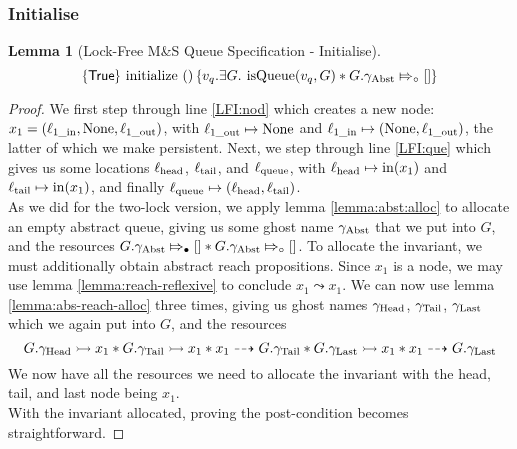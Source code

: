 \documentclass[a4paper, 10pt]{report}
\theoremstyle{definition}
\newtheorem{lemma}[theorem]{Lemma}
\newcommand{\initialise}{\operatorname{initialize}}
\newcommand{\msq}{M\&S Queue}
\newcommand{\lfmsq}{Lock-Free \msq{}}
\newcommand{\isqueue}{\operatorname{isQueue}}
\newcommand{\vq}{v_q}
\newcommand{\locinM}[1]{\loc_{#1\_\mathrm{in}}}
\newcommand{\locoutM}[1]{\loc_{#1\_\mathrm{out}}}
\newcommand{\locN}[1]{\loc_{\mathrm{#1}}}
\newcommand{\lochead}{\locN{head}}
\newcommand{\loctail}{\locN{tail}}
\newcommand{\locqueue}{\locN{queue}}
\newcommand{\nIn}[1]{\operatorname{in}(#1)}
\newcommand{\node}{x}
\newcommand{\nodeM}[1]{\node_{#1}}
\newcommand{\Qg}{G}
\newcommand{\gabst}{\gname_{\mathrm{Abst}}}
\newcommand{\ghead}{\gname_{\mathrm{Head}}}
\newcommand{\gtail}{\gname_{\mathrm{Tail}}}
\newcommand{\glast}{\gname_{\mathrm{Last}}}
\newcommand{\abstractstatefullfrag}[2]{#1 \Mapsto_{\circ} #2}
\newcommand{\abstractstateauth}[2]{#1 \Mapsto_{\bullet} #2}
\newcommand{\reach}[2]{#1 \leadsto #2}
\newcommand{\ar}[2]{#1 \dashrightarrow #2}
\newcommand{\ap}[2]{#1 \rightarrowtail #2}
\newcommand{\hocapspecinitHTGen}[2]{\hoare{\TRUE}{\initialise \ \TT}{#1 . \Exists #2 . \isqueue(#1, #2) \star{} \abstractstatefullfrag{#2.\gabst}{[]}}}
\newcommand{\hocapspecinitGen}[2]{\hocapspecinitHTGen{#1}{#2}}
\newcommand{\hocapspecinit}{\hocapspecinitGen{\vq}{\Qg}}
\begin{document}
\subsubsection{Initialise}
\begin{lemma}[\lfmsq{} Specification - Initialise]\label{LFMSQSPECS:spec:init}
  \begin{equation*}
    \hocapspecinit
  \end{equation*}
\end{lemma}
\begin{proof}
We first step through line \ref{LFI:nod} which creates a new node: $\nodeM{1} = (\locinM{1}, \None, \locoutM{1})$, with $\locoutM{1} \mapsto \None$ and $\locinM{1} \mapsto (\None, \locoutM{1})$, the latter of which we make persistent. Next, we step through line \ref{LFI:que} which gives us some locations $\lochead$, $\loctail$, and $\locqueue$, with $\lochead \mapsto \nIn{\nodeM{1}}$ and $\loctail \mapsto \nIn{\nodeM{1}}$, and finally $\locqueue \mapsto (\lochead, \loctail)$.\\
As we did for the two-lock version, we apply lemma \ref{lemma:abst:alloc} to allocate an empty abstract queue, giving us some ghost name $\gabst$ that we put into $\Qg$, and the resources $\abstractstateauth{\Qg.\gabst}{[]} \star{} \abstractstatefullfrag{\Qg.\gabst}{[]}$. To allocate the invariant, we must additionally obtain abstract reach propositions. Since $\nodeM{1}$ is a node, we may use lemma \ref{lemma:reach-reflexive} to conclude $\reach{\nodeM{1}}{\nodeM{1}}$. We can now use lemma \ref{lemma:abs-reach-alloc} three times, giving us ghost names $\ghead$, $\gtail$, $\glast$ which we again put into $\Qg$, and the resources
\begin{equation*}
  \ap{\Qg.\ghead}{\nodeM{1}} \star{} \ap{\Qg.\gtail}{\nodeM{1}} \star{} \ar{\nodeM{1}}{\Qg.\gtail} \star{} \ap{\Qg.\glast}{\nodeM{1}} \star{} \ar{\nodeM{1}}{\Qg.\glast}
\end{equation*}
We now have all the resources we need to allocate the invariant with the head, tail, and last node being $\nodeM{1}$.\\
With the invariant allocated, proving the post-condition becomes straightforward.
\end{proof}
\end{document}
